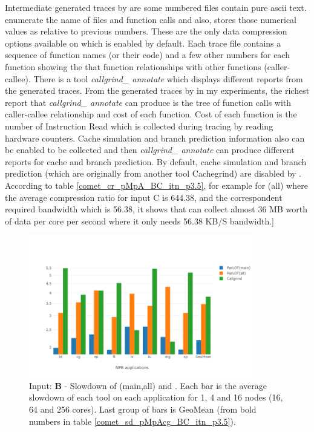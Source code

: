 \begin{itemize}
Intermediate generated traces by \callgrind are some numbered files contain pure ascii text. \callgrind enumerate the name of files and function calls and also, stores those numerical values as relative to previous numbers. These are the only data compression options available on \callgrind which is enabled by default. Each \callgrind trace file contains a sequence of function names (or their code) and a few other numbers for each function showing the that function relationships with other functions (caller-callee). There is a tool \textit{callgrind\_ annotate} which displays different reports from the generated traces. From the generated traces by \callgrind in my experiments, the richest report that \textit{callgrind\_ annotate} can produce is the tree of function calls with caller-callee relationship and cost of each function. Cost of each function is the number of Instruction Read which is collected during tracing by reading hardware counters. Cache simulation and branch prediction information also can be enabled to be collected and then \textit{callgrind\_ annotate} can produce different reports for cache and branch prediction. By default, cache simulation and branch prediction (which are originally from another tool Cachegrind) are disabled by \callgrind.
According to table \ref{comet_cr_pMpA_BC_itn_p3.5}, for example for \parlot(all) where the average compression ratio for input C is 644.38, and the correspondent required bandwidth which is 56.38, it shows that \parlot can collect almost 36 MB worth of data per core per second where it only needs 56.38 KB/S bandwidth.]
\end{itemize}

\begin{figure}[!t]
\centering
\includegraphics[width=3.9in]{figs.comet/comet_chartAvg_sd_B_p3_5.png}
\caption{ Input: \textbf{B} - Slowdown of \parlot(main,all) and \callgrind. Each bar is the average slowdown of each tool on each application for 1, 4 and 16 nodes (16, 64 and 256 cores). Last group of bars is GeoMean (from bold numbers in table \ref{comet_sd_pMpAcg_BC_itn_p3.5}). 
}
\label{comet_chartAvg_sd_B_p3_5}
\end{figure}


